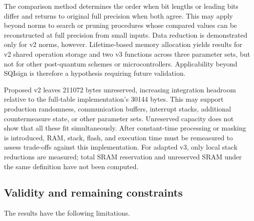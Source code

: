 \documentclass[a4paper,10pt]{article}
\theoremstyle{definition}
\theoremstyle{remark}
\begin{document}
The comparison method determines the order when bit lengths or leading bits differ and returns to original full precision when both agree. This may apply beyond norms to search or pruning procedures whose compared values can be reconstructed at full precision from small inputs. Data reduction is demonstrated only for v2 norms, however. Lifetime-based memory allocation yields results for v2 shared operation storage and two v3 functions across three parameter sets, but not for other post-quantum schemes or microcontrollers. Applicability beyond SQIsign is therefore a hypothesis requiring future validation.

Proposed v2 leaves \num{211072} bytes unreserved, increasing integration headroom relative to the full-table implementation's \num{30144} bytes. This may support production randomness, communication buffers, interrupt stacks, additional countermeasure state, or other parameter sets. Unreserved capacity does not show that all these fit simultaneously. After constant-time processing or masking is introduced, RAM, stack, flash, and execution time must be remeasured to assess trade-offs against this implementation. For adapted v3, only local stack reductions are measured; total SRAM reservation and unreserved SRAM under the same definition have not been computed.

\subsection{Validity and remaining constraints}
\label{sec:limitations}

The results have the following limitations.
\end{document}
